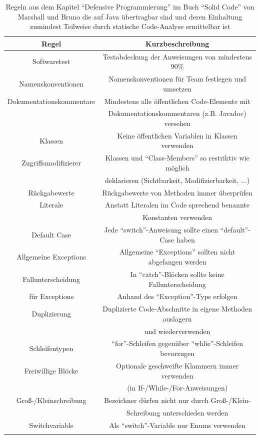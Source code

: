 \documentclass[da,ngerman]{stthesis}
\begin{document}
				\begin{center}
					\tabulinesep=1.5mm
					\begin{longtabu}{|c|c|}
						\hline
  						\textbf{Regel} & \textbf{Kurzbeschreibung}\\
  						\hline
  						Softwaretest & Testabdeckung der Anweisungen von mindestens 90\% \\ 
  						\hline   
  						Namenskonventionen & Namenskonventionen für Team festlegen und umsetzen \\
  						\hline
  						Dokumentationskommentare & Mindestens alle öffentlichen Code-Elemente mit \\ & Dokumentationskommentaren (z.B. Javadoc) versehen \\
  						\hline
  						Klassen & Keine öffentlichen Variablen in Klassen verwenden \\
  						\hline
  						Zugriffsmodifizierer & Klassen und "`Class-Members"' so restriktiv wie möglich \\ & deklarieren (Sichtbarkeit, Modifizierbarkeit, ...) \\
  						\hline
  						Rückgabewerte & Rückgabewerte von Methoden immer überprüfen \\
  						\hline
  						Literale & Anstatt Literalen im Code sprechend benannte \\ &  Konstanten verwenden \\
  						\hline
  						Default Case & Jede "`switch"'-Anweisung sollte einen "`default"'-Case haben \\
  						\hline
  						Allgemeine Exceptions & Allgemeine "`Exceptions"' sollten nicht abgefangen werden \\
  						\hline
  						Fallunterscheidung & In "`catch"'-Blöcken sollte keine Fallunterscheidung \\ für Exceptions & Anhand des "`Exception"'-Typs erfolgen \\
  						\hline
  						Duplizierung & Duplizierte Code-Abschnitte in eigene Methoden auslagern \\ & und wiederverwenden \\
  						\hline
  						Schleifentypen & "`for"'-Schleifen gegenüber "`whlie"'-Schleifen bevorzugen \\
  						\hline
  						Freiwillige Blöcke & Optionale geschweifte Klammern immer verwenden \\ & (in If-/While-/For-Anweisungen) \\
  						\hline
  						Groß-/Kleinschreibung & Bezeichner dürfen nicht nur durch Groß-/Klein- \\ & Schreibung unterschieden werden \\
  						\hline
  						Switchvariable & Als "`switch"'-Variable nur Enums verwenden \\
  						\hline
  						\caption{Regeln aus dem Kapitel "`Defensive Programmierung"' im Buch "`Solid Code"' von Marshall und Bruno die auf Java übertragbar sind und deren Einhaltung zumindest Teilweise durch statische Code-Analyse ermittelbar ist \cite{SolidCode}}
						\label{solidcoderules}
  					\end{longtabu}   
  				\end{center}
\end{document}

